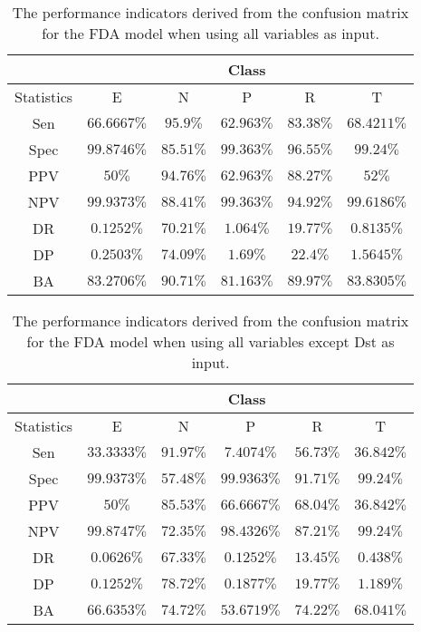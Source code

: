 \begin{table}[!ht]
	\centering
	\begin{tabular}{|c|c|c|c|c|c|}
		\hline
		 & \multicolumn{5}{c|}{Class} \\ \hline
		Statistics & E & N & P & R & T \\ \hline
		Sen & $66.6667\%$ & $95.9\%$ & $62.963\%$ & $83.38\%$ & $68.4211\%$ \\ \hline
		Spec & $99.8746\%$ & $85.51\%$ & $99.363\%$ & $96.55\%$ & $99.24\%$ \\ \hline
		PPV & $50\%$ & $94.76\%$ & $62.963\%$ & $88.27\%$ & $52\%$ \\ \hline
		NPV & $99.9373\%$ & $88.41\%$ & $99.363\%$ & $94.92\%$ & $99.6186\%$ \\ \hline
		DR & $0.1252\%$ & $70.21\%$ & $1.064\%$ & $19.77\%$ & $0.8135\%$ \\ \hline
		DP & $0.2503\%$ & $74.09\%$ & $1.69\%$ & $22.4\%$ & $1.5645\%$ \\ \hline
		BA & $83.2706\%$ & $90.71\%$ & $81.163\%$ & $89.97\%$ & $83.8305\%$ \\ \hline
	\end{tabular}
	\caption{The performance indicators derived from the confusion matrix for the FDA model when using all variables as input.}
	\label{tab:cs:reverse:all:fda}
\end{table}

\begin{table}[!ht]
	\centering
	\begin{tabular}{|c|c|c|c|c|c|}
		\hline
		 & \multicolumn{5}{c|}{Class} \\ \hline
		Statistics & E & N & P & R & T \\ \hline
		Sen & $33.3333\%$ & $91.97\%$ & $7.4074\%$ & $56.73\%$ & $36.842\%$ \\ \hline
		Spec & $99.9373\%$ & $57.48\%$ & $99.9363\%$ & $91.71\%$ & $99.24\%$ \\ \hline
		PPV & $50\%$ & $85.53\%$ & $66.6667\%$ & $68.04\%$ & $36.842\%$ \\ \hline
		NPV & $99.8747\%$ & $72.35\%$ & $98.4326\%$ & $87.21\%$ & $99.24\%$ \\ \hline
		DR & $0.0626\%$ & $67.33\%$ & $0.1252\%$ & $13.45\%$ & $0.438\%$ \\ \hline
		DP & $0.1252\%$ & $78.72\%$ & $0.1877\%$ & $19.77\%$ & $1.189\%$ \\ \hline
		BA & $66.6353\%$ & $74.72\%$ & $53.6719\%$ & $74.22\%$ & $68.041\%$ \\ \hline
	\end{tabular}
	\caption{The performance indicators derived from the confusion matrix for the FDA model when using all variables except Dst as input.}
	\label{tab:cs:reverse:noDst:fda}
\end{table}

